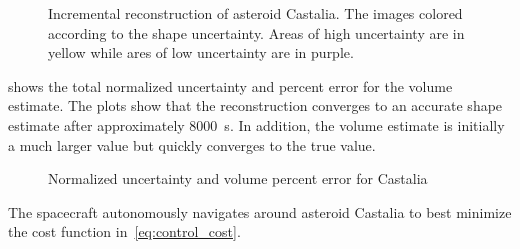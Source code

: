\documentclass[journal]{new-aiaa}
\begin{document}
\begin{figure}[htbp]
    \caption[Asteroid Castalia shape reconstruction with uncertainty]{Incremental reconstruction of asteroid Castalia. The images colored according to the shape uncertainty. Areas of high uncertainty are in yellow while ares of low uncertainty are in purple.~\label{fig:castalia_weights_reconstruction}}
\end{figure}

 shows the total normalized uncertainty and percent error for the volume estimate. 
The plots show that the reconstruction converges to an accurate shape estimate after approximately \SI{8000}{\second}.
In addition, the volume estimate is initially a much larger value but quickly converges to the true value.
\begin{figure}[htbp]
    \centering
    
    \caption{Normalized uncertainty and volume percent error for Castalia\label{fig:castalia_metrics}}
\end{figure}
The spacecraft autonomously navigates around asteroid Castalia to best minimize the cost function in~\cref{eq:control_cost}.
\end{document}
